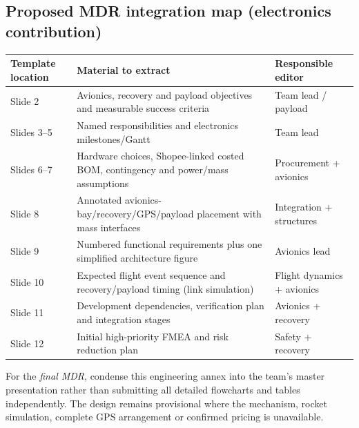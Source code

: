 \subsection*{Proposed MDR integration map (electronics contribution)}
\small
\begin{tabularx}{\linewidth}{@{}L{22mm}Y L{40mm}@{}}
\toprule{}\textbf{Template location}&\textbf{Material to extract}&\textbf{Responsible editor}\\\midrule
Slide 2 & Avionics, recovery and payload objectives and measurable success criteria & Team lead / payload\\
Slides 3--5 & Named responsibilities and electronics milestones/Gantt & Team lead\\
Slides 6--7 & Hardware choices, Shopee-linked costed BOM, contingency and power/mass assumptions & Procurement + avionics\\
Slide 8 & Annotated avionics-bay/recovery/GPS/payload placement with mass interfaces & Integration + structures\\
Slide 9 & Numbered functional requirements plus one simplified architecture figure & Avionics lead\\
Slide 10 & Expected flight event sequence and recovery/payload timing (link simulation) & Flight dynamics + avionics\\
Slide 11 & Development dependencies, verification plan and integration stages & Avionics + recovery\\
Slide 12 & Initial high-priority FMEA and risk reduction plan & Safety + recovery\\
\bottomrule
\end{tabularx}
\normalsize

For the \emph{final MDR}, condense this engineering annex into the team's master presentation rather than submitting all detailed flowcharts and tables independently. The design remains provisional where the mechanism, rocket simulation, complete GPS arrangement or confirmed pricing is unavailable.

